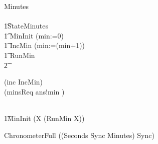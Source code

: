 \begin{circus}
\circprocess Minutes \circdef\\\ \circbegin\\
\t1\circstate StateMinutes \\
\t1 MinInit \circdef (min:=0)\\
\t1 IncMin \circdef (min:=(min+1))\\
\t1 RunMin \circdef\\\t2
\begin{block}
  (inc \then IncMin)\\
  \extchoice (minsReq \then ans!min \then \Skip)\\
\end{block}\\
 \t1\circspot MinInit \circseq (\circmu X \circspot (RunMin \circseq X))\\
\circend
\end{circus}
\begin{circus}
  \circprocess ChronometerFull \circdef ((Seconds \lpar Sync \rpar Minutes) \circhide Sync)
\end{circus}
%
%
%
%
